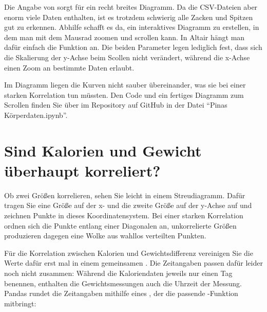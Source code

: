 \medskip



\medskip


Die Angabe von  sorgt für ein recht breites Diagramm. Da die CSV-Dateien aber enorm viele Daten enthalten, ist es trotzdem schwierig alle Zacken und Spitzen gut zu erkennen. Abhilfe schafft es da, ein interaktives Diagramm zu erstellen, in dem man mit dem Mausrad zoomen und scrollen kann. In Altair hängt man dafür einfach die Funktion  an. Die beiden Parameter legen lediglich fest, dass sich die Skalierung der y-Achse beim Scollen nicht verändert, während die x-Achse einen Zoom an bestimmte Daten erlaubt.

Im Diagramm liegen die Kurven nicht sauber übereinander, was sie bei einer starken Korrelation tun müssten. Den Code und ein fertiges Diagramm zum Scrollen finden Sie über  im Repository auf GitHub in der Datei ``Pinas Körperdaten.ipynb''.

\section{Sind Kalorien und Gewicht überhaupt korreliert?}


Ob zwei Größen korrelieren, sehen Sie leicht in einem Streudiagramm. Dafür tragen Sie eine Größe auf der x- und die zweite Größe auf der y-Achse auf und zeichnen Punkte in dieses Koordinatensystem. Bei einer starken Korrelation ordnen sich die Punkte entlang einer Diagonalen an, unkorrelierte Größen produzieren dagegen eine Wolke aus wahllos verteilten Punkten.

Für die Korrelation zwischen Kalorien und Gewichtsdifferenz vereinigen Sie die Werte dafür erst mal in einem gemeinsamen . Die Zeitangaben passen dafür leider noch nicht zusammen: Während die Kaloriendaten jeweils nur einen Tag benennen, enthalten die Gewichtsmessungen auch die Uhrzeit der Messung. Pandas rundet die Zeitangaben mithilfe eines , der die passende -Funktion mitbringt:


\medskip




